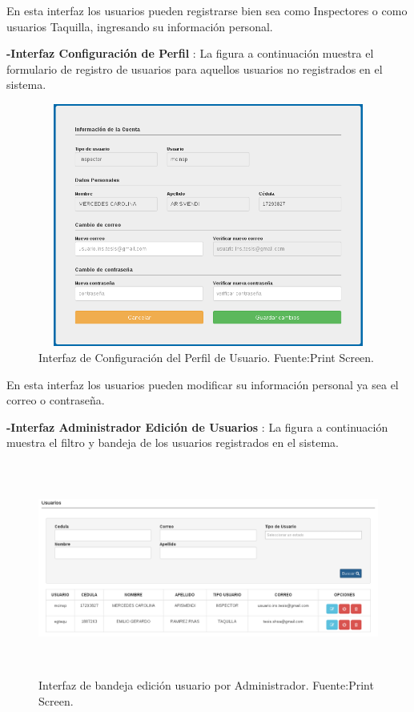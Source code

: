 En esta interfaz los usuarios pueden registrarse bien sea como Inspectores o como usuarios Taquilla, ingresando su información personal.


\textbf{-Interfaz Configuración de Perfil }: La figura a continuación muestra el formulario de registro de usuarios para aquellos usuarios no registrados en el sistema.

\begin{figure}[H]
\begin{center}
	\includegraphics[width=12cm,height=8cm]{img/interfaces/editar_usuario.png}
\end{center}
\caption{Interfaz de Configuración del Perfil de Usuario. Fuente:Print Screen.}
\label{fig:interfaz_configuracion_usuario}
\end{figure}

En esta interfaz los usuarios pueden modificar su información personal ya sea el correo o contraseña.


\textbf{-Interfaz Administrador Edición de Usuarios }: La figura a continuación muestra el filtro y bandeja de los usuarios registrados en el sistema.

\begin{figure}[H]
\begin{center}
	\includegraphics[width=\textwidth,height=7cm]{img/interfaces/bandeja_edicion_usuarios.png}
\end{center}
\caption{Interfaz de bandeja edición usuario por Administrador. Fuente:Print Screen.}
\label{fig:interfaz_bandeja_edicion_usuario}
\end{figure}


